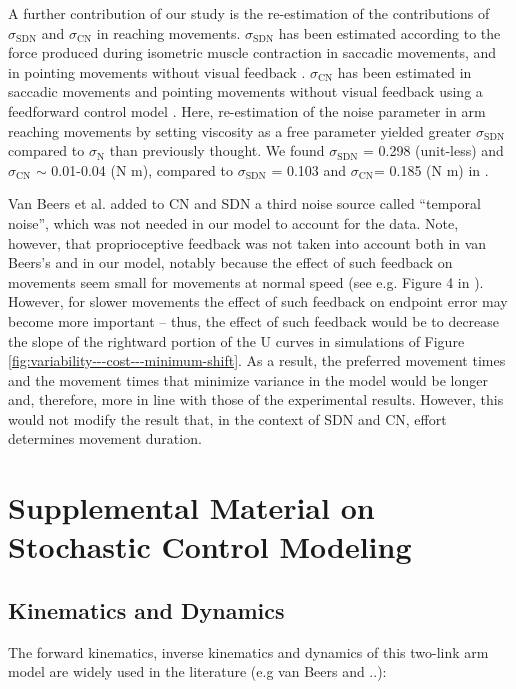 A further contribution of our study is the re-estimation of the contributions of $\sigma_{\text{SDN}}$ and $\sigma_{\text{CN}}$ in reaching movements. 
$\sigma_{\text{SDN}}$ has been estimated according to the force produced during isometric muscle contraction \cite{Jones2002, Slifkin1999} in saccadic movements, and in pointing movements without visual feedback \cite{VanBeers2004}. $\sigma_{\text{CN}}$ has been estimated in saccadic movements \cite{VanBeers2008} and pointing movements without visual feedback using a feedforward control model \cite{VanBeers2004}. 
Here, re-estimation of the noise parameter in arm reaching movements by setting viscosity as a free parameter yielded greater $\sigma_{\text{SDN}}$ compared to $\sigma_{\text{N}}$ than previously thought. We found $\sigma_{\text{SDN}}$ = 0.298 (unit-less) and $\sigma_{\text{CN}}$ $\sim$ 0.01-0.04 (N m), compared to $\sigma_{\text{SDN}}$ = 0.103 and $\sigma_{\text{CN}}$= 0.185 (N m) in \cite{VanBeers2004}. 

Van Beers et al. added to CN and SDN a third noise source called “temporal noise”, which was not needed in our model to account for the data. 
Note, however, that proprioceptive feedback was not taken into account both in van Beers’s and in our model, notably because the effect of such feedback on movements seem small for movements at normal speed (see e.g. Figure 4 in \cite{Franklin2007}). 
However, for slower movements the effect of such feedback on endpoint error may become more important – thus, the effect of such feedback would be to decrease the slope of the rightward portion of the U curves in simulations of Figure \ref{fig:variability---cost---minimum-shift}. 
As a result, the preferred movement times and the movement times that minimize variance in the model would be longer and, therefore, more in line with those of the experimental results. 
However, this would not modify the result that, in the context of SDN and CN, effort determines movement duration.


\section{Supplemental Material on Stochastic Control Modeling}
\label{app:oc}

\subsection{Kinematics and Dynamics}
\label{app:kindyn}
The forward kinematics, inverse kinematics and dynamics of this two-link arm model are widely used in the literature (e.g van Beers and ..):

